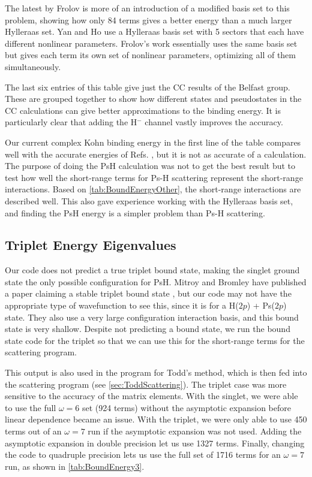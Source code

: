 \documentclass[Dissertation.tex]{subfiles}
\begin{document}
The latest by Frolov \cite{Frolov2010} is more of an introduction of a modified basis set to this problem, showing how only 84 terms gives a better energy than a much larger Hylleraas set. Yan and Ho \cite{Yan1999} use a Hylleraas basis set with 5 sectors that each have different nonlinear parameters. Frolov's work essentially uses the same basis set but gives each term its own set of nonlinear parameters, optimizing all of them simultaneously.

The last six entries of this table give just the CC results of the Belfast group. These are grouped together to show how different states and pseudostates in the CC calculations can give better approximations to the binding energy. It is particularly clear that adding the H$^-$ channel vastly improves the accuracy.

Our current complex Kohn binding energy in the first line of the table compares well with the accurate energies of Refs. \cite{Bubin2006, Mitroy2006, Yan1999}, but it is not as accurate of a calculation. The purpose of doing the PsH calculation was not to get the best result but to test how well the short-range terms for Ps-H scattering represent the short-range interactions. Based on \cref{tab:BoundEnergyOther}, the short-range interactions are described well. This also gave experience working with the Hylleraas basis set, and finding the PsH energy is a simpler problem than Ps-H scattering.

\subsection{Triplet Energy Eigenvalues}

Our code does not predict a true triplet bound state, making the singlet ground state the only possible configuration for PsH. Mitroy and Bromley have published a paper \cite{Mitroy2007} claiming a stable triplet bound state , but our code may not have the appropriate type of wavefunction to see this, since it is for a H($2p$) + Ps($2p$) state. They also use a very large configuration interaction basis, and this bound state is very shallow. Despite not predicting a bound state, we run the bound state code for the triplet so that we can use this for the short-range terms for the scattering program.

This output is also used in the program for Todd's method, which is then fed into the scattering program (see \cref{sec:ToddScattering}). The triplet case was more sensitive to the accuracy of the matrix elements. With the singlet, we were able to use the full $\omega = 6$ set (924 terms) without the asymptotic expansion before linear dependence became an issue. With the triplet, we were only able to use 450 terms out of an $\omega = 7$ run if the asymptotic expansion was not used. Adding the asymptotic expansion in double precision let us use 1327 terms. Finally, changing the code to quadruple precision lets us use the full set of 1716 terms for an $\omega = 7$ run, as shown in \cref{tab:BoundEnergy3}. 
\end{document}
